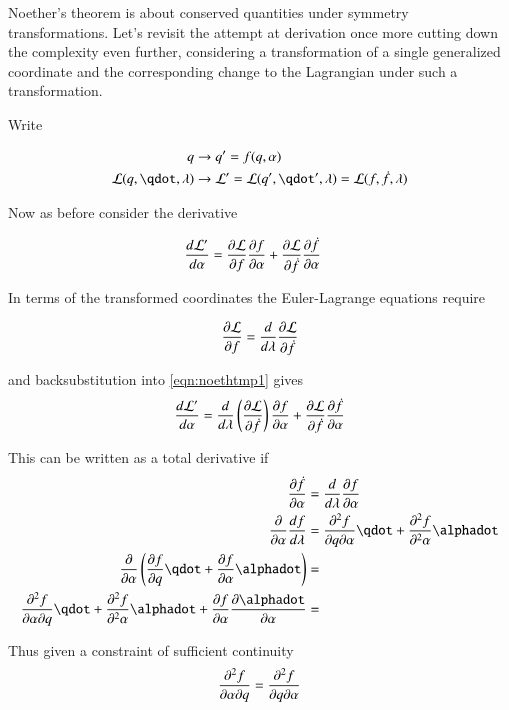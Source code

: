\documentclass{article}
\newcommand{\DD}[2]{\frac{d{#2}}{d{#1}}}
\begin{document}
Noether's theorem is about conserved quantities under symmetry transformations.  Let's revisit the attempt at derivation once more cutting down the complexity
even further, considering a transformation of a single generalized coordinate and the corresponding change to the Lagrangian under such a transformation.

Write

\begin{align*}
q &\rightarrow q' = f(q, \alpha) \\
\LL(q, \qdot, \lambda) &\rightarrow \LL' = \LL(q', \qdot', \lambda) = \LL(f, \fdot, \lambda)
\end{align*}

Now as before consider the derivative 

\begin{align}\label{eqn:noethtmp1}
\DD{\alpha}{\LL'} &= \PD{f}{\LL} \PD{\alpha}{f} + \PD{\fdot}{\LL} \PD{\alpha}{\fdot}
\end{align}

In terms of the transformed coordinates the Euler-Lagrange equations require

\begin{align*}
\PD{f}{\LL} = \frac{d}{d\lambda} \PD{\fdot}{\LL}
\end{align*}

and backsubstitution into \ref{eqn:noethtmp1} gives
\begin{align}\label{eqn:noethtmp2}
\DD{\alpha}{\LL'} &= \frac{d}{d\lambda} \left( \PD{\fdot}{\LL} \right) \PD{\alpha}{f} + \PD{\fdot}{\LL} \PD{\alpha}{\fdot} \\
\end{align}

This can be written as a total derivative if 
\begin{align*}
\PD{\alpha}{\fdot} &= \frac{d}{d\lambda} \PD{\alpha}{f} \\
\PD{\alpha}{} \frac{df}{d\lambda} &= \PDD{q}{\alpha}{f} \qdot + \PDsq{\alpha}{f} \alphadot \\
\PD{\alpha}{} \left( \PD{q}{f} \qdot + \PD{\alpha}{f} \alphadot \right) &= \\
\PDD{\alpha}{q}{f} \qdot + \PDsq{\alpha}{f} \alphadot + \PD{\alpha}{f} \PD{\alpha}{\alphadot} &= \\
\end{align*}

Thus given a constraint of sufficient continuity
\begin{align*}
\PDD{\alpha}{q}{f} &= \PDD{q}{\alpha}{f} \\
\end{align*}
\end{document}
